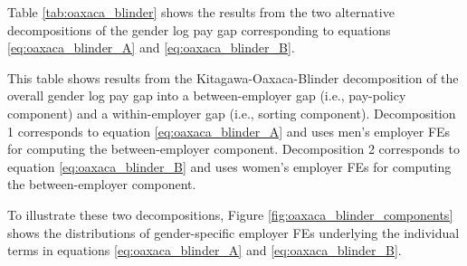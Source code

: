 Table \ref{tab:oaxaca_blinder} shows the results from the two alternative decompositions of the gender log pay gap corresponding to equations \eqref{eq:oaxaca_blinder_A} and \eqref{eq:oaxaca_blinder_B}.

%
\begin{table}[htbp!]
    \caption{Alternative Kitagawa-Oaxaca-Blinder decompositions of the gender log pay gap}
    \label{tab:oaxaca_blinder}
    \resizebox{\textwidth}{!}{%
    
    }
    \begin{tablenotes}
        \footnotesize
        This table shows results from the Kitagawa-Oaxaca-Blinder decomposition of the overall gender log pay gap into a between-employer gap (i.e., pay-policy component) and a within-employer gap (i.e., sorting component). Decomposition 1 corresponds to equation \eqref{eq:oaxaca_blinder_A} and uses men's employer FEs for computing the between-employer component. Decomposition 2 corresponds to equation \eqref{eq:oaxaca_blinder_B} and uses women's employer FEs for computing the between-employer component. %
    \end{tablenotes}
    \begin{tablenotes}[Source]
        \sourcedata%
    \end{tablenotes}
\end{table}
%

To illustrate these two decompositions, Figure \ref{fig:oaxaca_blinder_components} shows the distributions of gender-specific employer FEs underlying the individual terms in equations \eqref{eq:oaxaca_blinder_A} and \eqref{eq:oaxaca_blinder_B}.

